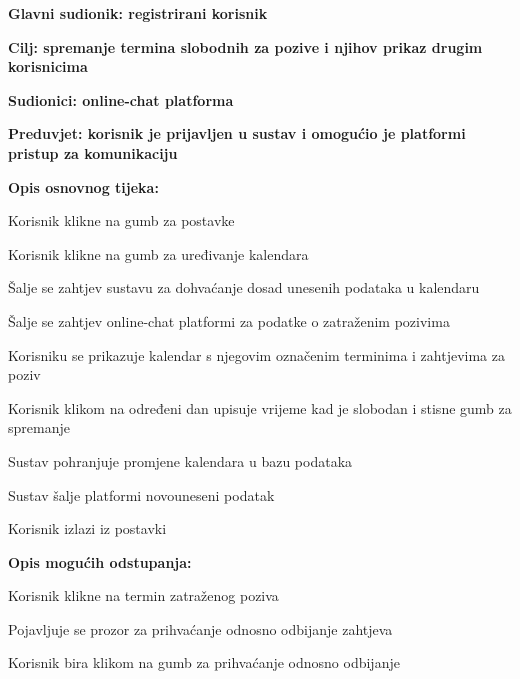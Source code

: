 					\noindent {}
					\begin{packed_item}
						\item \textbf{Glavni sudionik: registrirani korisnik}
						\item  \textbf{Cilj: spremanje termina slobodnih za pozive i njihov prikaz drugim korisnicima}
						\item  \textbf{Sudionici: online-chat platforma}
						\item  \textbf{Preduvjet: korisnik je prijavljen u sustav i omogućio je platformi pristup za komunikaciju}
						
						\item  \textbf{Opis osnovnog tijeka:}
						\item[] \begin{packed_enum}
							\item Korisnik klikne na gumb za postavke
							\item Korisnik klikne na gumb za uređivanje kalendara
							\item Šalje se zahtjev sustavu za dohvaćanje dosad unesenih podataka u kalendaru
							\item Šalje se zahtjev online-chat platformi za podatke o zatraženim pozivima
							\item Korisniku se prikazuje kalendar s njegovim označenim terminima i zahtjevima za poziv
							\item Korisnik klikom na određeni dan upisuje vrijeme kad je slobodan i stisne gumb za spremanje
							\item Sustav pohranjuje promjene kalendara u bazu podataka
							\item Sustav šalje platformi novouneseni podatak
							\item Korisnik izlazi iz postavki
						\end{packed_enum}
						
						\item  \textbf{Opis mogućih odstupanja:}
							\begin{packed_item}
								\item[6.a] Korisnik klikne na termin zatraženog poziva
								\begin{packed_enum}
									\item Pojavljuje se prozor za prihvaćanje odnosno odbijanje zahtjeva
									\item Korisnik bira klikom na gumb za prihvaćanje odnosno odbijanje
								\end{packed_enum}
							\end{packed_item}
					\end{packed_item}

